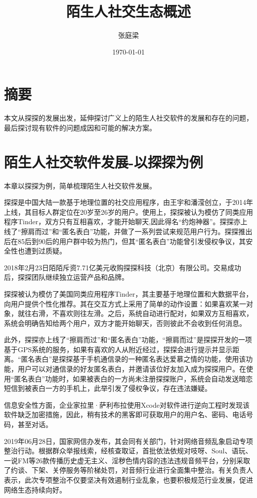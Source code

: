 \documentclass[UTF8]{ctexart}
\title{陌生人社交生态概述}
\author{张庭梁}
\date{\today}
\begin{document}
\maketitle

\section{摘要}

本文从探探的发展出发，延伸探讨广义上的陌生人社交软件的发展和存在的问题，最后探讨现有软件的问题成因和可能的解决方案。

\section{陌生人社交软件发展-以探探为例}
本章以探探为例，简单梳理陌生人社交软件发展。

探探是中国大陆一款基于地理位置的社交应用程序，由王宇和潘滢创立，于2014年上线，其目标人群定位在20岁至26岁的用户。使用上，探探被认为模仿了同类应用程序Tinder，双方只有互相喜欢，才能开始聊天,因此得名“约炮神器”。探探亦上线了“擦肩而过”和“匿名表白”功能，并做了一系列尝试来规范用户行为。探探推出后在85后到90后的用户群中较为热门，但其“匿名表白”功能曾引发侵权争议，其安全性也遭到过质疑。

2018年2月23日陌陌斥资7.71亿美元收购探探科技（北京）有限公司。交易成功后，探探团队继续独立运营产品和品牌。\cite{MoMoHistory}

探探被认为模仿了美国同类应用程序Tinder，其主要基于地理位置和大数据平台，向用户提供个性化推荐。其在交互方式上采用了简单的动作设置：如果喜欢某一对象，就往右滑，不喜欢则往左滑。之后，系统自动进行配对，如果双方互相喜欢，系统会明确告知给两个用户，双方才能开始聊天，否则彼此不会收到任何消息。

此外，探探亦上线了“擦肩而过”和“匿名表白”功能，“擦肩而过”是探探开发的一项基于GPS系统的服务，如果有喜欢的人从附近经过，探探会进行提示并显示距离。“匿名表白”是探探基于手机通信录的一种匿名表达爱慕之情的功能，使用该功能，用户可以对通信录的好友匿名表白，并邀请该位好友加入成为探探用户。在使用“匿名表白”功能时，如果被表白的一方尚未注册探探账户，系统会自动发送暗恋短信到被表白一方的手机上，此举引发了侵权争议，存在违法嫌疑。

信息安全性方面，企业家拉里·萨利布拉使用Xcode对软件进行逆向工程时发现该软件缺乏加密措施，因此，稍有技术的黑客即可获取用户的用户名、密码、电话号码，甚至对话。

2019年06月28日，国家网信办发布，其会同有关部门，针对网络音频乱象启动专项整治行动。根据群众举报线索，经核查取证，首批依法依规对吱呀、Soul、语玩、一说FM等26款传播历史虚无主义、淫秽色情内容的违法违规音频平台，分别采取了约谈、下架、关停服务等阶梯处罚，对音频行业进行全面集中整治。有关负责人表示，此次专项整治不仅要坚决有效遏制行业乱象，也要积极规范行业发展，促进网络生态持续向好。\cite{Audio}
\end{document}
